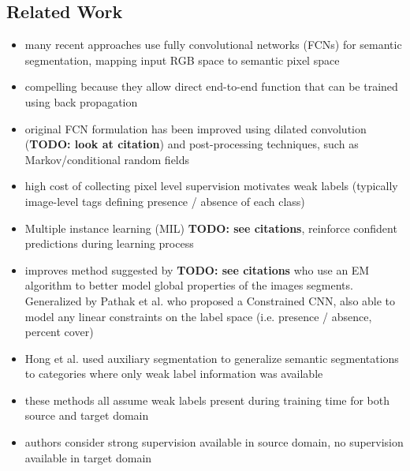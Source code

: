 \documentclass[]{article}
\newcommand{\todo}[1]{{\color{red}\bf{TODO: #1}}}
\begin{document}
\subsection{Related Work}

\begin{itemize}
	\item many recent approaches use fully convolutional networks (FCNs) for semantic segmentation, mapping input RGB space to semantic pixel space
	\item compelling because they allow direct end-to-end function that can be trained using back propagation
	\item original FCN formulation has been improved using dilated convolution (\todo{look at citation}) and post-processing techniques, such as Markov/conditional random fields
	\item high cost of collecting pixel level supervision motivates weak labels (typically image-level tags defining presence / absence of each class)
	\item Multiple instance learning (MIL) \todo{see citations}, reinforce confident predictions during learning process
	\item improves method suggested by \todo{see citations} who use an EM algorithm to better model global properties of the images segments. Generalized by Pathak et al. who proposed a Constrained CNN, also able to model any linear constraints on the label space (i.e. presence / absence, percent cover)
	\item Hong et al. used auxiliary segmentation to generalize semantic segmentations to categories where only weak label information was available
	\item these methods all assume weak labels present during training time for both source and target domain
	\item authors consider strong supervision available in source domain, no supervision available in target domain
\end{itemize}
\end{document}
